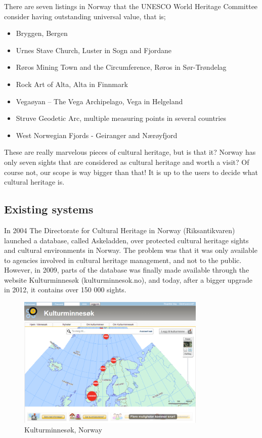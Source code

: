 \documentclass[11pt]{book}
\begin{document}
There are seven listings in Norway that the UNESCO World Heritage Committee consider having outstanding universal value, that is;

\begin{itemize}
  \item Bryggen, Bergen
  \item Urnes Stave Church, Luster in Sogn and Fjordane
  \item Røros Mining Town and the Circumference, Røros in Sør-Trøndelag
  \item Rock Art of Alta, Alta in Finnmark
  \item Vegaøyan -- The Vega Archipelago, Vega in Helgeland
  \item Struve Geodetic Arc, multiple measuring points in several countries
  \item West Norwegian Fjords - Geiranger and Nærøyfjord
\end{itemize}

These are really marvelous pieces of cultural heritage, but is that it? Norway has only seven sights that are considered as cultural heritage and worth a visit? Of course not, our scope is way bigger than that! It is up to the users to decide what cultural heritage is.

\subsection{Existing systems}
In 2004 The Directorate for Cultural Heritage in Norway (Riksantikvaren) launched a database, called Askeladden, over protected cultural heritage sights and cultural environments in Norway. The problem was that it was only available to agencies involved in cultural heritage management, and not to the public. However,  in 2009, parts of the database was finally made available through the website Kulturminnesøk (kulturminnesok.no), and today, after a bigger upgrade in 2012, it contains over 150 000 sights.

\begin{figure}[H]
      \centering
      \includegraphics[width=0.8\textwidth]{Figures/Prestudy/kulturminnesokOversikt.png}
      \caption{Kulturminnesøk, Norway}
      \label{fig:pre_kulturoversikt}
\end{figure}
\end{document}
